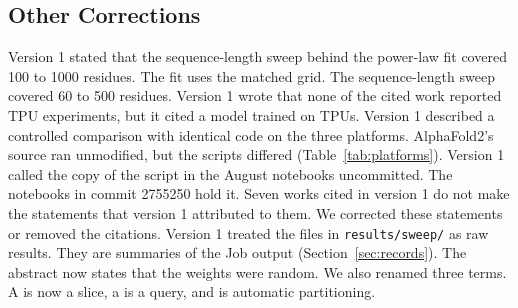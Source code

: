 \subsection*{Other Corrections}
Version 1 stated that the sequence-length sweep behind the power-law fit covered 100 to 1000 residues. The fit uses the
matched grid.
The sequence-length sweep covered 60 to 500 residues. %
Version 1 wrote that none of the cited work reported TPU experiments, but it cited a model trained on TPUs. Version 1
described a controlled comparison with identical code on the three platforms. AlphaFold2's source ran unmodified, but
the scripts differed (Table~\ref{tab:platforms}). Version 1 called the copy of the script in the August notebooks
uncommitted.
The notebooks in commit 2755250 hold it. %
Seven works cited in version 1 do not make the statements that version 1 attributed to them. We corrected these statements or
removed the citations. Version 1 treated the files in \texttt{results/sweep/} as raw results. They are summaries of the
Job output (Section~\ref{sec:records}). The abstract now states that the weights were random. We also renamed three
terms. A  is now a slice, a  is a query, and  is
automatic partitioning.
